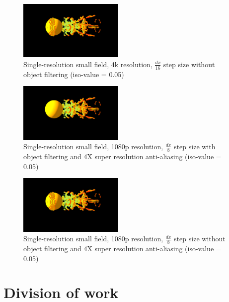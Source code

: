 \documentclass[acmtog]{acmart}
\begin{document}
    \begin{figure}[H]
        \centering
        \includegraphics[width=0.45\textwidth]{./image/single_small_4k_16_no_filter}
        \caption{Single-resolution small field, 4k resolution, $ \frac{dx}{16} $ step size without object filtering (iso-value = 0.05)}\label{fig:figure14}
    \end{figure}

    \begin{figure}[H]
        \centering
        \includegraphics[width=0.45\textwidth]{./image/single_small_1080p_8_filter_4XRES}
        \caption{Single-resolution small field, 1080p resolution, $ \frac{dx}{8} $ step size with object filtering and 4X super resolution anti-aliasing (iso-value = 0.05)}\label{fig:figure15}
    \end{figure}

    \begin{figure}[H]
        \centering
        \includegraphics[width=0.45\textwidth]{./image/single_small_1080p_8_no_filter_4XRES}
        \caption{Single-resolution small field, 1080p resolution, $ \frac{dx}{8} $ step size without object filtering and 4X super resolution anti-aliasing (iso-value = 0.05)}\label{fig:figure16}
    \end{figure}

    \section{Division of work}\label{sec:division-of-work}
\end{document}
